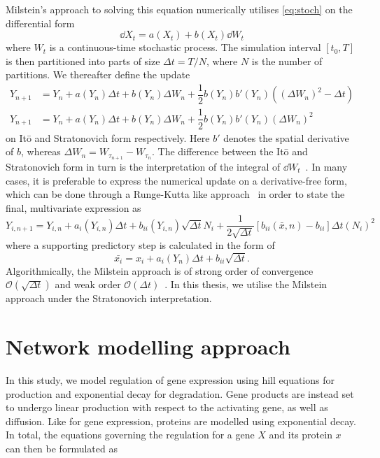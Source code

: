 Milstein's approach to solving this equation numerically utilises
\cref{eq:stoch} on the differential form 
\begin{equation}
  \dd X_t = a(X_t) + b(X_t) \dd W_t
  \label{eq:milstein_form}
\end{equation}
where $W_t$ is a continuous-time stochastic process. The simulation interval
$\left[ t_0, T \right]$is then partitioned into parts of size $\Delta t = T /
N$, where $N$ is the number of partitions. We thereafter define the update
\begin{align}
  Y_{n+1} &= Y_n + 
  a(Y_n)\Delta t + 
  b(Y_n)\Delta W_n +
  \dfrac{1}{2}b(Y_n)b'(Y_n)\left( \left( \Delta W_n \right)^2 - \Delta t \right) \\
  Y_{n+1} &= Y_n + 
  a(Y_n)\Delta t + 
  b(Y_n)\Delta W_n + 
  \dfrac{1}{2} b(Y_n)b'(Y_n) \left(\Delta W_n\right)^2 
  \label{eq:milstein_deriv}
\end{align}
on It\={o} and Stratonovich form respectively. Here $b'$ denotes the spatial
derivative of $b$, whereas $\Delta W_n = W_{\tau_{n+1}} - W_{\tau_n}$. The
difference between the It\={o} and Stratonovich form in turn is the
interpretation of the integral of $\dd W_t$~\cite{klimontovich1990ito}. In many cases, it is
preferable to express the numerical update on a derivative-free form, which can
be done through a Runge-Kutta like approach~\cite{garcia2011comparison} in order to state the final,
multivariate expression as 
\begin{equation}
  Y_{i, n+1} = Y_{i, n} + a_i\left( Y_{i,n} \right) \Delta t + 
  b_{ii}(Y_{i,n}) \sqrt{\Delta t} N_i + \dfrac{1}{2\sqrt{\Delta t}} \left[
    b_{ii}(\bar x, n) - b_{ii} \right]
  \Delta t (N_i)^2 
  \label{eq:milstein_deriv_free}
\end{equation}
where a supporting predictory step is calculated in the form of 
\begin{equation}
  \bar {x_i} = x_i + a_i\left( Y_n \right)\Delta t + b_{ii}\sqrt {\Delta t}.
  \label{eq:milstein_predictor}
\end{equation}
Algorithmically, the Milstein approach is of strong order of convergence
$\mathcal O \left( \sqrt{\Delta t }\right)$ and weak order $\mathcal O \left(
  \Delta t \right)$~\cite{garcia2011comparison}. In this thesis, we utilise the Milstein approach under the
Stratonovich interpretation.

\section{Network modelling approach}
\label{sec:modelling_approach}
In this study, we model regulation of gene expression using hill equations for
production and exponential decay for degradation. Gene products are instead
set to undergo linear production with respect to the activating gene, as well as
diffusion. Like for gene expression, proteins are modelled using exponential
decay. In total, the equations governing the regulation for a gene $X$ and its
protein $x$ can then be formulated as

